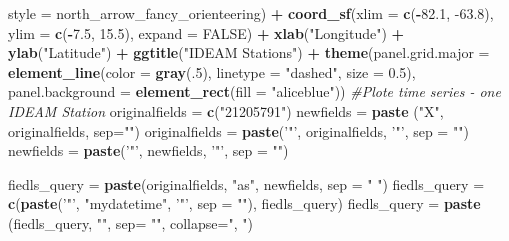\documentclass[12pt,oneside]{reedthesis}
\newenvironment{Shaded}{\begin{snugshade}}{\end{snugshade}}
\newcommand{\CommentTok}[1]{\textcolor[rgb]{0.56,0.35,0.01}{\textit{#1}}}
\newcommand{\DataTypeTok}[1]{\textcolor[rgb]{0.13,0.29,0.53}{#1}}
\newcommand{\DecValTok}[1]{\textcolor[rgb]{0.00,0.00,0.81}{#1}}
\newcommand{\FloatTok}[1]{\textcolor[rgb]{0.00,0.00,0.81}{#1}}
\newcommand{\KeywordTok}[1]{\textcolor[rgb]{0.13,0.29,0.53}{\textbf{#1}}}
\newcommand{\NormalTok}[1]{#1}
\newcommand{\OperatorTok}[1]{\textcolor[rgb]{0.81,0.36,0.00}{\textbf{#1}}}
\newcommand{\OtherTok}[1]{\textcolor[rgb]{0.56,0.35,0.01}{#1}}
\newcommand{\StringTok}[1]{\textcolor[rgb]{0.31,0.60,0.02}{#1}}
\begin{document}
\begin{Shaded}
\begin{Highlighting}[]
   \DataTypeTok{style =}\NormalTok{ north_arrow_fancy_orienteering) }\OperatorTok{+}\StringTok{ }
\StringTok{  }\KeywordTok{coord_sf}\NormalTok{(}\DataTypeTok{xlim =} \KeywordTok{c}\NormalTok{(}\OperatorTok{-}\FloatTok{82.1}\NormalTok{, }\FloatTok{-63.8}\NormalTok{), }\DataTypeTok{ylim =} \KeywordTok{c}\NormalTok{(}\OperatorTok{-}\FloatTok{7.5}\NormalTok{, }\FloatTok{15.5}\NormalTok{), }\DataTypeTok{expand =} \OtherTok{FALSE}\NormalTok{) }\OperatorTok{+}
\StringTok{  }\KeywordTok{xlab}\NormalTok{(}\StringTok{"Longitude"}\NormalTok{) }\OperatorTok{+}\StringTok{ }
\StringTok{  }\KeywordTok{ylab}\NormalTok{(}\StringTok{"Latitude"}\NormalTok{) }\OperatorTok{+}\StringTok{ }
\StringTok{  }\KeywordTok{ggtitle}\NormalTok{(}\StringTok{"IDEAM Stations"}\NormalTok{) }\OperatorTok{+}\StringTok{ }
\StringTok{  }\KeywordTok{theme}\NormalTok{(}\DataTypeTok{panel.grid.major =} \KeywordTok{element_line}\NormalTok{(}\DataTypeTok{color =} \KeywordTok{gray}\NormalTok{(.}\DecValTok{5}\NormalTok{), }\DataTypeTok{linetype =} \StringTok{"dashed"}\NormalTok{, }\DataTypeTok{size =} \FloatTok{0.5}\NormalTok{), }\DataTypeTok{panel.background =} \KeywordTok{element_rect}\NormalTok{(}\DataTypeTok{fill =} \StringTok{"aliceblue"}\NormalTok{))}
\CommentTok{#Plote time series - one IDEAM Station}
\NormalTok{originalfields =}\StringTok{ }\KeywordTok{c}\NormalTok{(}\StringTok{"21205791"}\NormalTok{)}
\NormalTok{newfields =}\StringTok{ }\KeywordTok{paste}\NormalTok{ (}\StringTok{"X"}\NormalTok{, originalfields, }\DataTypeTok{sep=}\StringTok{""}\NormalTok{)}
\NormalTok{originalfields =}\StringTok{ }\KeywordTok{paste}\NormalTok{(}\StringTok{'"'}\NormalTok{, originalfields, }\StringTok{'"'}\NormalTok{, }\DataTypeTok{sep =} \StringTok{""}\NormalTok{)}
\NormalTok{newfields =}\StringTok{ }\KeywordTok{paste}\NormalTok{(}\StringTok{'"'}\NormalTok{, newfields, }\StringTok{'"'}\NormalTok{, }\DataTypeTok{sep =} \StringTok{""}\NormalTok{)}

\NormalTok{fiedls_query =}\StringTok{ }\KeywordTok{paste}\NormalTok{(originalfields, }\StringTok{"as"}\NormalTok{, newfields, }\DataTypeTok{sep =} \StringTok{" "}\NormalTok{)}
\NormalTok{fiedls_query =}\StringTok{ }\KeywordTok{c}\NormalTok{(}\KeywordTok{paste}\NormalTok{(}\StringTok{'"'}\NormalTok{, }\StringTok{"mydatetime"}\NormalTok{, }\StringTok{'"'}\NormalTok{, }\DataTypeTok{sep =} \StringTok{""}\NormalTok{), fiedls_query)}
\NormalTok{fiedls_query =}\StringTok{ }\KeywordTok{paste}\NormalTok{ (fiedls_query, }\StringTok{""}\NormalTok{, }\DataTypeTok{sep=} \StringTok{""}\NormalTok{, }\DataTypeTok{collapse=}\StringTok{", "}\NormalTok{)}


\end{Highlighting}
\end{Shaded}
\end{document}
